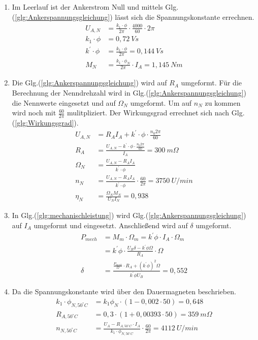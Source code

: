 \begin{solution}
\begin{enumerate}
\item Im Leerlauf ist der Ankerstrom Null und mittels Glg.(\ref{glg:Ankerspannungsgleichung}) lässt sich die Spannungskonstante errechnen.
\begin{align}
U_{A,N} &= \frac{k_1 \cdot \phi}{2 \pi} \cdot \frac{4000}{60} \cdot 2 \pi\\
k_1 \cdot \phi &= 0,72~Vs\\
k^{'} \cdot \phi &= \frac{k_1 \cdot \phi}{2 \pi} = 0,144~Vs\\
M_N &= \frac{k_1 \cdot \phi_N}{2 \pi} \cdot I_A = 1,145~Nm
\end{align}
\item Die Glg.(\ref{glg:Ankerspannungsgleichung}) wird auf $R_A$ umgeformt. Für die Berechnung der Nenndrehzahl wird in Glg.(\ref{glg:Ankerspannungsgleichung}) die Nennwerte eingesetzt und auf $\Omega_N$ umgeformt. Um auf $n_N$ zu kommen wird noch mit $\frac{60}{2 \pi}$ mulitpliziert. Der Wirkungsgrad errechnet sich nach Glg.(\ref{glg:Wirkungsgrad}).
\begin{align}
U_{A,N} &= R_A I_A + k^{'}\cdot \phi \cdot \frac{n_0 2 \pi}{60}\\
R_A &= \frac{U_{A,N} -k^{'}\cdot \phi \cdot \frac{n_0 2 \pi}{60}}{I_A} = 300~m\Omega\\
\Omega_N &= \frac{U_{A,N} - R_A I_A}{k^{'}\cdot \phi}\\
n_N &= \frac{U_{A,N} - R_A I_A}{k^{'}\cdot \phi} \cdot \frac{60}{2 \pi} = 3750 ~U /min\\
\eta_N &= \frac{\Omega_N M_N}{U_N I_N} = 0,938
\end{align}
\item In Glg.(\ref{glg:mechanischleistung}) wird Glg.(\ref{glg:Ankerspannungsgleichung}) auf $I_A$ umgeformt und eingesetzt. Anschließend wird auf $\delta$ umgeformt.
\begin{align}
P_{mech} &=M_m \cdot \Omega_m = k^{'} \phi \cdot I_A \cdot \Omega_m\\
&= k^{'} \phi \cdot \frac{U_B \delta - k^{'} \phi \Omega}{R_A} \cdot \Omega\\
\delta &= \frac{\frac{P_{mech}}{\Omega} \cdot R_A + (k^{'} \phi)^2 \Omega}{k^{'} \phi U_B}=0,552
\end{align}
\item Da die Spannungskonstante wird über den Dauermagneten beschrieben.
\begin{align}
k_1 \cdot \phi_{N,50^\circ C}&= k_1 \phi_N \cdot (1 - 0,002 \cdot 50)= 0,648\\
R_{A,50^\circ C} &= 0,3 \cdot (1+ 0,00393 \cdot 50) = 359~m\Omega\\
n_{N,50^\circ C} &= \frac{U_A -R_{A,50^\circ C} \cdot I_A}{k_1 \cdot \phi_{N,50^\circ C}}\cdot \frac{60}{2 \pi} = 4112 ~U/min
\end{align}
\end{enumerate}
\end{solution}